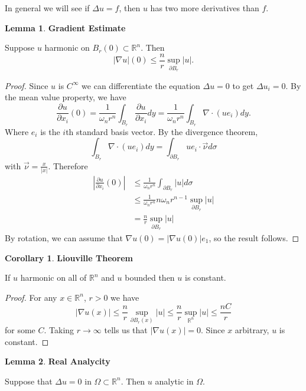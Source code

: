 \documentclass[12pt, a4paper]{article}
\theoremstyle{definition}
\newtheorem{lemma}{Lemma}
\newtheorem{cor}{Corollary}
\newcommand{\R}{\mathbb{R}}                           %
\newcommand{\bd}{\partial}
\newcommand{\grad}{\nabla}
\begin{document}
In general we will see if $\Delta u = f$, then $u$ has two more derivatives than $f$. 
\begin{tcolorbox}
\begin{lemma}
	\textbf{Gradient Estimate}
\end{lemma}
	Suppose $u$ harmonic on $B_r(0) \subset \R^n$. Then 
	$$ |\grad u|(0) \leq \frac{ n }{ r } \sup_{\bd B_r} |u|. $$ 
\end{tcolorbox}
	\begin{proof}
	Since $u$ is $C^\infty$ we can differentiate the equation $\Delta u = 0$ to get $\Delta u_i = 0$. By the mean value property, we have
		$$ \frac{ \partial u }{ \partial x_i }(0) = \frac{ 1 }{ \omega_n r^n }\int_{B_r} \frac{ \partial u }{ \partial x_i } dy = \frac{ 1 }{ \omega_n r^n } \int_{B_r} \grad \cdot (u e_i)dy. $$
Where $e_i$ is the $i$th standard basis vector. 
By the divergence theorem, 
		$$ \int_{B_r} \grad \cdot \left( u e_i \right) dy = \int_{\bd B_r} ue_i \cdot \vec{\nu} d\sigma $$ 
with $\vec{\nu} = \frac{ x }{ |x| }$. 
Therefore
\begin{align*}
	\left| \frac{ \partial u }{ \partial x_i  }(0) \right| & \leq \frac{ 1 }{ \omega_n r^n } \int_{\bd B_r} |u| d \sigma 
	\\ & \leq \frac{ 1 }{ \omega_n r^n } n \omega_n r^{n-1} \sup_{\bd B_r} |u|
	\\ & = \frac{ n }{ r }\sup_{\bd B_r} |u|
\end{align*}
		By rotation, we can assume that $\grad u(0) = |\grad u(0)| e_1$, so the result follows. 
	\end{proof}
\begin{tcolorbox}
\begin{cor}
	\textbf{Liouville Theorem}
\end{cor}
If $u$ harmonic on all of $\R^n$ and $u$ bounded then $u$ is constant. 
\end{tcolorbox}
\begin{proof}
For any $x\in \R^n$, $r>0$ we have
	$$ |\grad u(x)| \leq \frac{ n }{ r }\sup_{\bd B_r(x)} |u| \leq \frac{ n }{ r } \sup_{\R^n} |u| \leq \frac{ nC }{ r } $$
for some $C$. Taking $r\to \infty$ tells us that $|\grad u(x)| = 0$. Since $x$ arbitrary, $u$ is constant. 
\end{proof}
\begin{tcolorbox}
\begin{lemma}
	\textbf{Real Analycity}
\end{lemma}
Suppose that $\Delta u = 0$ in $\Omega \subset \R^n$. Then $u$ analytic in $\Omega$. 
\end{tcolorbox}
\end{document}
